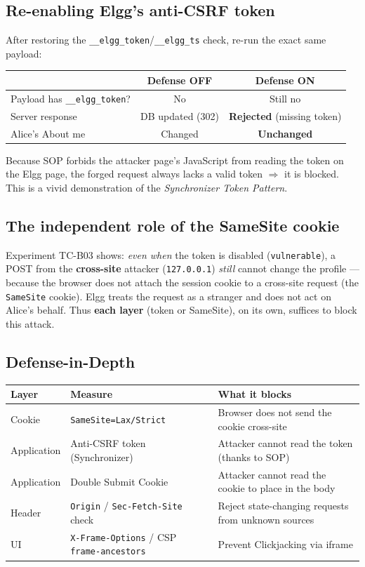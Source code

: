\documentclass[11pt,a4paper]{article}
\begin{document}
\subsection{Re-enabling Elgg's anti-CSRF token}
After restoring the \texttt{\_\_elgg\_token}/\texttt{\_\_elgg\_ts} check, re-run the exact same payload:
\begin{center}\small
\begin{tabularx}{\linewidth}{@{}Y C C@{}}
\toprule
 & \textbf{Defense OFF} & \textbf{Defense ON}\\
\midrule
Payload has \texttt{\_\_elgg\_token}? & No & Still no\\
Server response & DB updated (302) & \textbf{Rejected} (missing token)\\
Alice's About me & Changed & \textbf{Unchanged}\\
\bottomrule
\end{tabularx}
\end{center}
\noindent Because SOP forbids the attacker page's JavaScript from reading the token on the Elgg page, the forged request always lacks a valid token $\Rightarrow$ it is blocked. This is a vivid demonstration of the \emph{Synchronizer Token Pattern}.

\subsection{The independent role of the SameSite cookie}
Experiment TC-B03 shows: \emph{even when} the token is disabled (\texttt{vulnerable}), a POST from the \textbf{cross-site} attacker (\texttt{127.0.0.1}) \emph{still} cannot change the profile — because the browser does not attach the session cookie to a cross-site request (the \texttt{SameSite} cookie). Elgg treats the request as a stranger and does not act on Alice's behalf. Thus \textbf{each layer} (token or SameSite), on its own, suffices to block this attack.

\subsection{Defense-in-Depth}
\begin{center}\small
\begin{tabularx}{\linewidth}{@{}l Y Y@{}}
\toprule
\textbf{Layer} & \textbf{Measure} & \textbf{What it blocks}\\
\midrule
Cookie & \texttt{SameSite=Lax/Strict} & Browser does not send the cookie cross-site\\
Application & Anti-CSRF token (Synchronizer) & Attacker cannot read the token (thanks to SOP)\\
Application & Double Submit Cookie & Attacker cannot read the cookie to place in the body\\
Header & \texttt{Origin} / \texttt{Sec-Fetch-Site} check & Reject state-changing requests from unknown sources\\
UI & \texttt{X-Frame-Options} / CSP \texttt{frame-ancestors} & Prevent Clickjacking via iframe\\
\bottomrule
\end{tabularx}
\end{center}
\end{document}
